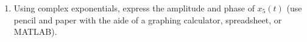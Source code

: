 \begin{enumerate}
\begin{enumerate}
 \item Using complex exponentials, express the amplitude and phase of $x_5(t)$ (use pencil and paper with the aide of a graphing calculator, spreadsheet, or MATLAB).
 \end{enumerate}
	

\end{enumerate}
